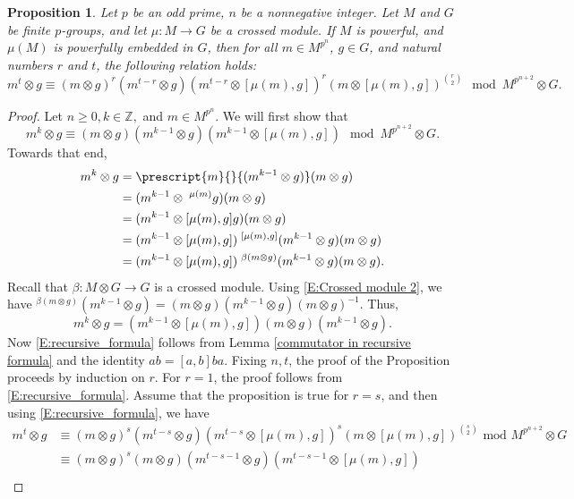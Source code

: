 \documentclass[12pt]{elsarticle}
\newtheorem*{main corollary*}{Main Corollary}
\newtheorem{prop}[theorem]{Proposition}
\theoremstyle{definition}
\begin{document}
\begin{prop}\label{Power_expansion_tensor_identity}
      Let $p$ be an odd prime, $n$ be a nonnegative integer. Let $M$ and $G$ be finite $p$-groups, and let $\mu:M\to G$ be a crossed module. If $M$ is powerful, and $\mu(M)$ is powerfully embedded in $G$, then for all ${m \in M^{p^n}}$, ${g \in G}$, and natural numbers $r$ and $t$, the following relation holds:
   \[m^t \otimes g\equiv(m\otimes g)^r(m^{t-r}\otimes g)(m^{t-r}\otimes [\mu(m),g])^r(m\otimes[\mu(m),g])^{\binom{r}{2}}\mod M^{p^{n+2}}\otimes G.  \]
 \end{prop}
\begin{proof}
    Let $n\geq 0, k\in \mathbb Z,$ and $m\in M^{p^n}$. We will first show that
    \begin{equation}\label{E:recursive_formula}
        m^k\otimes g\equiv (m\otimes g)(m^{k-1}\otimes g)(m^{k-1}\otimes [\mu(m),g])\mod M^{p^{n+2}}\otimes G.
    \end{equation}
    Towards that end,
    \begin{align*}
        m^k\otimes g &=\prescript{m}{}{(m^{k-1}\otimes g)} (m\otimes g)\\
        &= (m^{k-1}\otimes\;^{\mu(m)}g)(m\otimes g)\\
        &= (m^{k-1}\otimes [\mu(m),g]g)(m\otimes g)\\
        &= (m^{k-1}\otimes [\mu(m),g])\;^{[\mu(m),g]}(m^{k-1}\otimes g) (m\otimes g)\\
        &= (m^{k-1}\otimes [\mu(m),g])\;^{\beta(m\otimes g)}(m^{k-1}\otimes g) (m\otimes g).
    \end{align*} Recall that $\beta:M\otimes G\to G$ is a crossed module. Using \eqref{E:Crossed module 2}, we have $^{\beta(m\otimes g)}(m^{k-1}\otimes g)= (m\otimes g)(m^{k-1}\otimes g)(m\otimes g)^{-1}$. Thus,
    \[m^k\otimes g= (m^{k-1}\otimes [\mu(m),g])(m\otimes g)(m^{k-1}\otimes g). \]
    Now \eqref{E:recursive_formula} follows from Lemma \ref{commutator in recursive formula} and the identity $ab=[a,b]ba$. Fixing $n,t$, the proof of the Proposition
    proceeds by induction on $r$. For $r=1$, the proof  follows from \eqref{E:recursive_formula}. Assume that the proposition is true for $r=s$, and then using \eqref{E:recursive_formula}, we have \begin{align*}
       m^t \otimes g&\equiv(m\otimes g)^s(m^{t-s}\otimes g)(m^{t-s}\otimes [\mu(m),g])^s(m\otimes[\mu(m),g])^{\binom{s}{2}} \text{ mod }  M^{p^{n+2}}\otimes G \\
       &\equiv (m\otimes g)^s(m\otimes g)(m^{t-s-1}\otimes g)(m^{t-s-1}\otimes [\mu(m),g])\\

\end{align*}
\end{proof}
\end{document}
